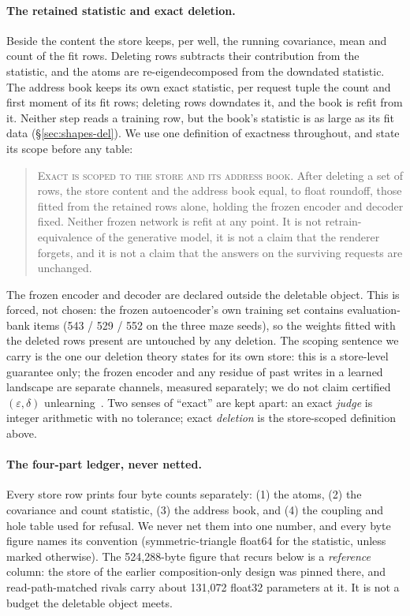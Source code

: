 \documentclass{article} %
\begin{document}
\paragraph{The retained statistic and exact deletion.} Beside the content the store keeps, per
well, the running covariance, mean and count of the fit rows. Deleting rows subtracts their
contribution from the statistic, and the atoms are re-eigendecomposed from the downdated
statistic. The address book keeps its own exact statistic, per request tuple the count and first
moment of its fit rows; deleting rows downdates it, and the book is refit from it. Neither step
reads a training row, but the book's statistic is as large as its fit data
(\S\ref{sec:shapes-del}). We use one definition of exactness throughout, and state its scope
before any table:

\begin{quote}\small
\textsc{Exact is scoped to the store and its address book.} After deleting a set of rows, the store
content and the address book equal, to float roundoff, those fitted from the retained rows alone,
holding the frozen encoder and decoder fixed. Neither frozen network is refit at any point. It is
not retrain-equivalence of the generative model, it is not a claim that the renderer forgets, and it
is not a claim that the answers on the surviving requests are unchanged.
\end{quote}

\noindent The frozen encoder and decoder are declared outside the deletable object. This is
forced, not chosen: the frozen autoencoder's own training set contains evaluation-bank items
(543 / 529 / 552 on the three maze seeds), so the weights fitted with the deleted rows present
are untouched by any deletion. %
The scoping sentence we carry is the one our deletion theory states for its own store: this is
a store-level guarantee only; the frozen encoder and any residue of past writes in a learned
landscape are separate channels, measured separately; we do not claim certified
$(\varepsilon,\delta)$ unlearning~\citep{guo2020certified}. %
Two senses of ``exact'' are kept apart: an exact \emph{judge} is integer arithmetic with no
tolerance; exact \emph{deletion} is the store-scoped definition above.

\paragraph{The four-part ledger, never netted.} Every store row prints four byte counts
separately: (1) the atoms, (2) the covariance and count statistic, (3) the address book, and
(4) the coupling and hole table used for refusal. We never net them into one number, and every
byte figure names its convention (symmetric-triangle float64 for the statistic, unless marked
otherwise). The 524,288-byte figure that recurs below is a \emph{reference} column: the store
of the earlier composition-only design was pinned there, and read-path-matched rivals carry
about 131,072 float32 parameters at it. %
It is not a budget the deletable object meets.
\end{document}
